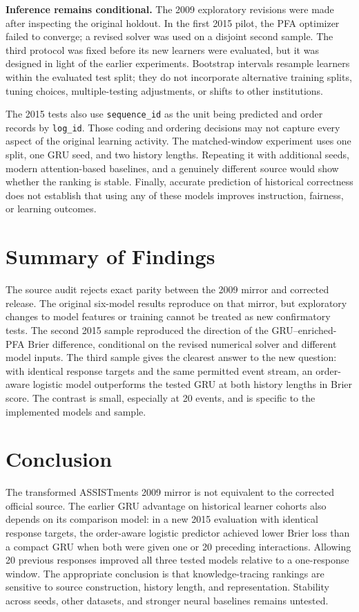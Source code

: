 \documentclass[11pt,a4paper]{article}
\begin{document}
\textbf{Inference remains conditional.} The 2009 exploratory revisions were made after inspecting the original holdout. In the first 2015 pilot, the PFA optimizer failed to converge; a revised solver was used on a disjoint second sample. The third protocol was fixed before its new learners were evaluated, but it was designed in light of the earlier experiments. Bootstrap intervals resample learners within the evaluated test split; they do not incorporate alternative training splits, tuning choices, multiple-testing adjustments, or shifts to other institutions.

The 2015 tests also use \texttt{sequence\_id} as the unit being predicted and order records by \texttt{log\_id}. Those coding and ordering decisions may not capture every aspect of the original learning activity. The matched-window experiment uses one split, one GRU seed, and two history lengths. Repeating it with additional seeds, modern attention-based baselines, and a genuinely different source would show whether the ranking is stable. Finally, accurate prediction of historical correctness does not establish that using any of these models improves instruction, fairness, or learning outcomes.

\section{Summary of Findings}
The source audit rejects exact parity between the 2009 mirror and corrected release. The original six-model results reproduce on that mirror, but exploratory changes to model features or training cannot be treated as new confirmatory tests. The second 2015 sample reproduced the direction of the GRU--enriched-PFA Brier difference, conditional on the revised numerical solver and different model inputs. The third sample gives the clearest answer to the new question: with identical response targets and the same permitted event stream, an order-aware logistic model outperforms the tested GRU at both history lengths in Brier score. The contrast is small, especially at 20 events, and is specific to the implemented models and sample.

\section{Conclusion}
The transformed ASSISTments 2009 mirror is not equivalent to the corrected official source. The earlier GRU advantage on historical learner cohorts also depends on its comparison model: in a new 2015 evaluation with identical response targets, the order-aware logistic predictor achieved lower Brier loss than a compact GRU when both were given one or 20 preceding interactions. Allowing 20 previous responses improved all three tested models relative to a one-response window. The appropriate conclusion is that knowledge-tracing rankings are sensitive to source construction, history length, and representation. Stability across seeds, other datasets, and stronger neural baselines remains untested.
\end{document}
